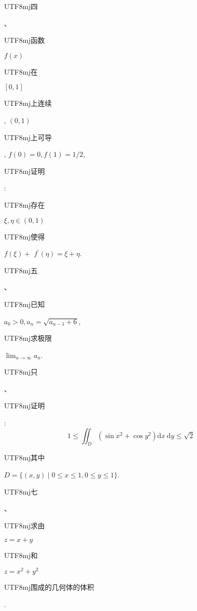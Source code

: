 \documentclass[10pt]{article}
\begin{document}
\begin{CJK}{UTF8}{mj}四\end{CJK}、\begin{CJK}{UTF8}{mj}函数\end{CJK} $f(x)$ \begin{CJK}{UTF8}{mj}在\end{CJK} $[0,1]$ \begin{CJK}{UTF8}{mj}上连续\end{CJK}, $(0,1)$ \begin{CJK}{UTF8}{mj}上可导\end{CJK}, $f(0)=0, f(1)=1 / 2$, \begin{CJK}{UTF8}{mj}证明\end{CJK}: \begin{CJK}{UTF8}{mj}存在\end{CJK} $\xi, \eta \in(0,1)$ \begin{CJK}{UTF8}{mj}使得\end{CJK} $f(\xi)+$ $f^{\prime}(\eta)=\xi+\eta$.

\begin{CJK}{UTF8}{mj}五\end{CJK}、\begin{CJK}{UTF8}{mj}已知\end{CJK} $a_{0}>0, a_{n}=\sqrt{a_{n-1}+6}$, \begin{CJK}{UTF8}{mj}求极限\end{CJK} $\lim _{n \rightarrow \infty} a_{n}$.

\begin{CJK}{UTF8}{mj}只\end{CJK}、\begin{CJK}{UTF8}{mj}证明\end{CJK}:
$$
1 \leq \iint_{D}\left(\sin x^{2}+\cos y^{2}\right) \mathrm{d} x \mathrm{~d} y \leq \sqrt{2}
$$
\begin{CJK}{UTF8}{mj}其中\end{CJK} $D=\{(x, y) \mid 0 \leq x \leq 1,0 \leq y \leq 1\}$.

\begin{CJK}{UTF8}{mj}七\end{CJK}、\begin{CJK}{UTF8}{mj}求由\end{CJK} $z=x+y$ \begin{CJK}{UTF8}{mj}和\end{CJK} $z=x^{2}+y^{2}$ \begin{CJK}{UTF8}{mj}围成的几何体的体积\end{CJK}.
\end{document}
